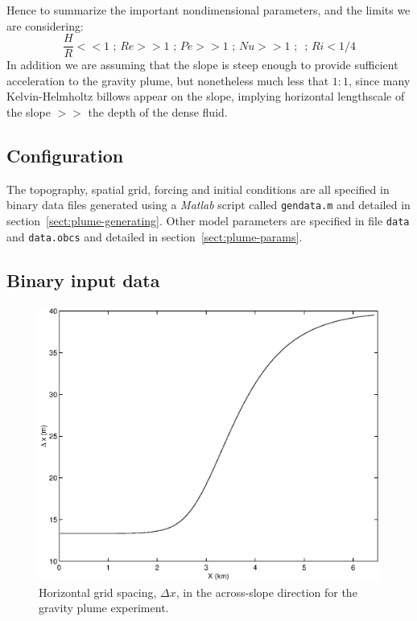 Hence to summarize the important nondimensional parameters, and 
the limits we are considering:
\begin{equation}
\frac{H}{R} << 1 \mbox{ ; } Re >> 1 \mbox{  ; } Pe >> 1 \mbox{  ; } Nu >> 1
\mbox{  ;  } \mbox{  ; } Ri < 1/4 
\end{equation}
In addition we are assuming that the slope is steep enough to provide 
sufficient acceleration  to the gravity plume, but nonetheless much less 
that $1:1$, since many Kelvin-Helmholtz billows appear on the slope, 
implying horizontal lengthscale of the slope $>>$ the depth of the 
dense fluid. 

\subsection{Configuration}
\label{www:tutorials}

The topography, spatial grid, forcing and initial conditions are all
specified in binary data files generated using a {\em Matlab} script
called {\tt gendata.m} and detailed in
section~\ref{sect:plume-generating}. Other model parameters are
specified in file {\tt data} and {\tt data.obcs} and detailed in
section~\ref{sect:plume-params}.

\subsection{Binary input data}
\label{www:tutorials}
\label{sect:plume-generating}

\begin{figure}
\begin{center}
\includegraphics[width=\textwidth,height=.3\textheight]{s_examples/plume_on_slope/dx.eps}
\end{center}
\caption{Horizontal grid spacing, $\Delta x$, in the across-slope
direction for the gravity plume experiment.}
\label{fig:dx-plume-on-slope}
\end{figure}

